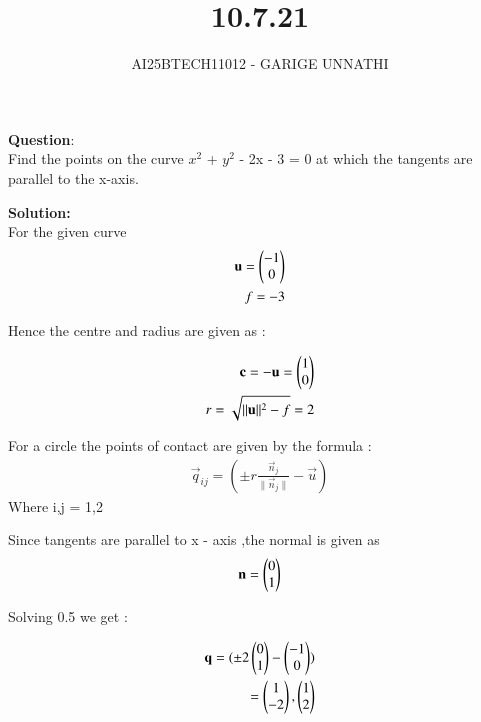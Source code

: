 \documentclass[journal]{IEEEtran}
\begin{document}



\title{10.7.21}
\author{AI25BTECH11012 - GARIGE UNNATHI}
{\let\newpage\relax\maketitle}


\renewcommand{\thefigure}{\theenumi}
\renewcommand{\thetable}{\theenumi}
\setlength{\intextsep}{10pt} %



\vspace{-1cm}

\textbf{Question}:\\
Find the points on the curve $x^2$ + $y^2$ - 2x - 3 = 0 at which the tangents are parallel
to the x-axis.


\textbf{Solution: }\\

For the given curve 
\begin{align}
    \mathbf{u} = \begin{pmatrix}-1\\0\end{pmatrix}\\
    f = -3
\end{align}

Hence the centre and radius are given as :

\begin{align}
 \mathbf{c} = -\mathbf{u} = \begin{pmatrix}1\\0\end{pmatrix}\\
 r = \sqrt{\lVert\mathbf{u}\rVert^2 - f} = 2
\end{align}

For a circle the points of contact are given by the formula :
\begin{align}
\vec{q}_{ij} = \left (\pm r \frac{\vec{n}_j}{{\lVert\vec{n}_j\rVert}} - \vec{u}\right)
\end{align}
Where i,j = 1,2

Since tangents are parallel to x - axis ,the normal is given as 
\begin{align}
  \mathbf{n} = \begin{pmatrix}0\\1\end{pmatrix}
\end{align}

Solving 0.5 we get :

\begin{align}
 \mathbf{q} = (\pm 2\begin{pmatrix}0\\1\end{pmatrix} - \begin{pmatrix}-1\\0\end{pmatrix})\\
= \begin{pmatrix}1\\-2\end{pmatrix} , \begin{pmatrix}1\\2\end{pmatrix}
\end{align}
\end{document}
